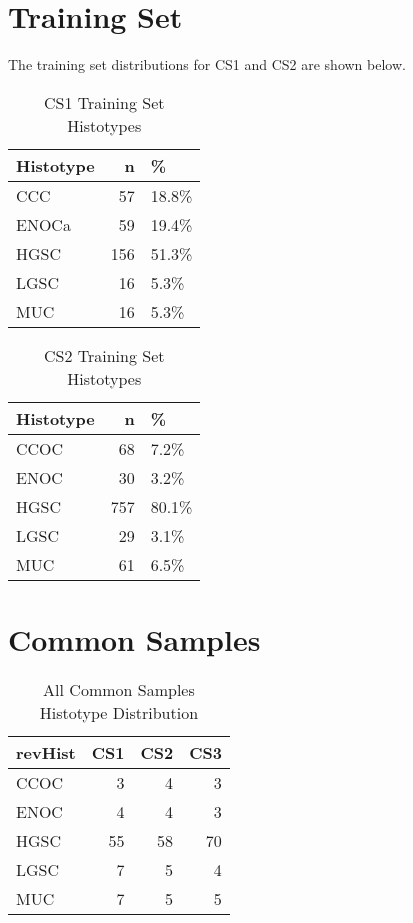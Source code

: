 \documentclass[
]{report}
\begin{document}
\hypertarget{training-set}{%
\section{Training Set}\label{training-set}}

The training set distributions for CS1 and CS2 are shown below.

\begin{table}

\caption{\label{tab:training-dist-cs1}CS1 Training Set Histotypes}
\centering
\begin{tabular}[t]{l|r|l}
\hline
Histotype & n & \%\\
\hline
CCC & 57 & 18.8\%\\
\hline
ENOCa & 59 & 19.4\%\\
\hline
HGSC & 156 & 51.3\%\\
\hline
LGSC & 16 & 5.3\%\\
\hline
MUC & 16 & 5.3\%\\
\hline
\end{tabular}
\end{table}

\begin{table}

\caption{\label{tab:training-dist-cs2}CS2 Training Set Histotypes}
\centering
\begin{tabular}[t]{l|r|l}
\hline
Histotype & n & \%\\
\hline
CCOC & 68 & 7.2\%\\
\hline
ENOC & 30 & 3.2\%\\
\hline
HGSC & 757 & 80.1\%\\
\hline
LGSC & 29 & 3.1\%\\
\hline
MUC & 61 & 6.5\%\\
\hline
\end{tabular}
\end{table}

\hypertarget{common-samples}{%
\section{Common Samples}\label{common-samples}}

\begin{table}

\caption{\label{tab:common-dist-all}All Common Samples Histotype Distribution}
\centering
\begin{tabular}[t]{l|r|r|r}
\hline
revHist & CS1 & CS2 & CS3\\
\hline
CCOC & 3 & 4 & 3\\
\hline
ENOC & 4 & 4 & 3\\
\hline
HGSC & 55 & 58 & 70\\
\hline
LGSC & 7 & 5 & 4\\
\hline
MUC & 7 & 5 & 5\\
\hline
\end{tabular}
\end{table}
\end{document}
